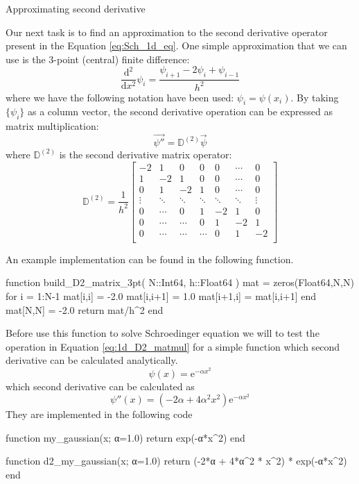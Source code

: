 \documentclass[a4paper]{article}
\begin{document}
Approximating second derivative

Our next task is to find an approximation to the second derivative operator
present in the Equation \eqref{eq:Sch_1d_eq}.
One simple approximation that we can use is the 3-point (central) finite difference:
\begin{equation}
\frac{\mathrm{d}^2}{\mathrm{d}x^2} \psi_{i} =
\frac{\psi_{i+1} - 2\psi_{i} + \psi_{i-1}}{h^2}
\end{equation}
where we have the following notation have been used: $\psi_{i} = \psi(x_{i})$.
%
By taking $\{ \psi_{i} \}$ as a column vector, the second derivative operation
can be expressed as matrix multiplication:
\begin{equation}
\vec{\psi''} = \mathbb{D}^{(2)} \vec{\psi}
\end{equation}
where $\mathbb{D}^{(2)}$ is the second derivative matrix operator:
\begin{equation}
\mathbb{D}^{(2)} = \frac{1}{h^2}
\begin{bmatrix}
-2  &  1  &  0  &  0  & 0 & \cdots & 0 \\
 1  & -2  &  1  &  0  & 0 & \cdots & 0 \\
 0  &  1  & -2  &  1  & 0 & \cdots & 0 \\
 \vdots  &  \ddots  &  \ddots  & \ddots  & \ddots  & \ddots & \vdots \\
 0 & \cdots & 0 & 1 & -2 & 1 & 0 \\
 0  &  \cdots  & \cdots & 0  & 1  & -2  & 1 \\
 0  &  \cdots  & \cdots & \cdots & 0  &  1  & -2 \\
\end{bmatrix}
\label{eq:1d_D2_matmul}
\end{equation}

An example implementation can be found in the following function.
\begin{juliacode}
function build_D2_matrix_3pt( N::Int64, h::Float64 )
    mat = zeros(Float64,N,N)
    for i = 1:N-1
        mat[i,i] = -2.0
        mat[i,i+1] = 1.0
        mat[i+1,i] = mat[i,i+1]
    end
    mat[N,N] = -2.0
    return mat/h^2
end
\end{juliacode}


Before use this function to solve Schroedinger equation we will to test the operation
in Equation \eqref{eq:1d_D2_matmul} for a simple function which second derivative
can be calculated analytically.
\begin{equation}
\psi(x) = \mathrm{e}^{-\alpha x^2}
\end{equation}
%
which second derivative can be calculated as
%
\begin{equation}
\psi''(x) = \left( -2 \alpha + 4\alpha^2 x^2 \right) \mathrm{e}^{-\alpha x^2}
\end{equation}
%
They are implemented in the following code
\begin{juliacode}
function my_gaussian(x; α=1.0)
    return exp(-α*x^2)
end

function d2_my_gaussian(x; α=1.0)
    return (-2*α + 4*α^2 * x^2) * exp(-α*x^2)
end
\end{juliacode}
\end{document}
